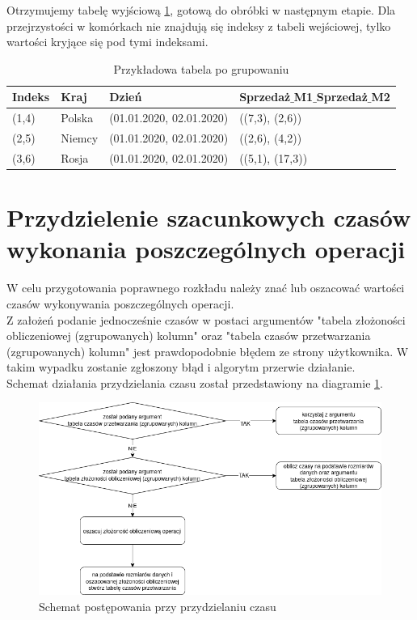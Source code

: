 \documentclass[brudnopis]{xmgr}
\begin{document}
Otrzymujemy tabelę wyjściową \ref{tab:example-output}, gotową do obróbki w następnym etapie.
Dla przejrzystości w komórkach nie znajdują się indeksy z tabeli wejściowej, tylko wartości kryjące się pod tymi indeksami.

\begin{table}[!tbh]
\begin{tabular}{|l|l|l|l|} \hline
Indeks & Kraj & Dzień & Sprzedaż$\_$M1$\_$Sprzedaż$\_$M2 \\ \hline
(1,4) & Polska & (01.01.2020, 02.01.2020) & ((7,3), (2,6)) \\ \hline
(2,5) & Niemcy & (01.01.2020, 02.01.2020) & ((2,6), (4,2)) \\ \hline
(3,6) & Rosja & (01.01.2020, 02.01.2020) & ((5,1), (17,3)) \\ \hline
\end{tabular}
\caption{Przykładowa tabela po grupowaniu\label{tab:example-output}}
\end{table}

\newpage

\section{Przydzielenie szacunkowych czasów wykonania poszczególnych operacji}

W celu przygotowania poprawnego rozkładu należy znać lub oszacować wartości czasów wykonywania poszczególnych operacji.
\medskip\\

Z założeń podanie jednocześnie czasów w postaci argumentów "tabela złożoności obliczeniowej (zgrupowanych) kolumn" oraz "tabela czasów przetwarzania (zgrupowanych) kolumn" jest prawdopodobnie błędem ze strony użytkownika. W takim wypadku zostanie zgłoszony błąd i algorytm przerwie działanie.
\medskip\\

Schemat działania przydzielania czasu został przedstawiony na diagramie \ref{diag:time-assign}.

\begin{figure}[!tbh]
\centering
\includegraphics[width=.8\hsize]{fig/przydzielanie_czasow.png}
\caption{Schemat postępowania przy przydzielaniu czasu\label{diag:time-assign}}
\end{figure}
\medskip\\
\end{document}
